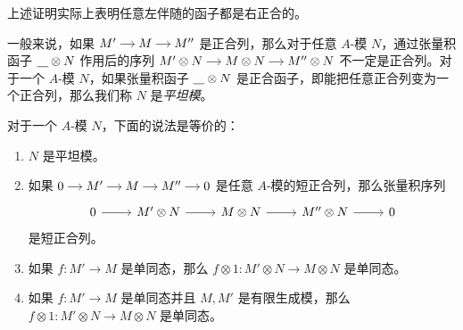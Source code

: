 上述证明实际上表明任意左伴随的函子都是右正合的。

一般来说，如果 
$
  \begin{tikzcd}[cramped,column sep=small]
    M'\arrow[r] & M\arrow[r] & M''
  \end{tikzcd}
$
是正合列，那么对于任意 $A$-模 $N$，通过张量积函子 $\uline\otimes N$ 作用后的序列
$
  \begin{tikzcd}[cramped,column sep=small]
    M'\otimes N\arrow[r] & M\otimes N\arrow[r] & M''\otimes N
  \end{tikzcd}
$
不一定是正合列。对于一个 $A$-模 $N$，如果张量积函子 $\uline\otimes N$ 
是正合函子，即能把任意正合列变为一个正合列，那么我们称 $N$ 是\emph{平坦模}。

\begin{proposition}
  对于一个 $A$-模 $N$，下面的说法是等价的：
  \begin{enumerate}
    \item $N$ 是平坦模。
    \item 如果 
    $
      \begin{tikzcd}[cramped,column sep=small]
        0\arrow[r] & M'\arrow[r] & M\arrow[r] & M''\arrow[r] & 0
      \end{tikzcd}
    $
    是任意 $A$-模的短正合列，那么张量积序列
    \[
      \begin{tikzcd}
        0\arrow[r] & M'\otimes N\arrow[r] & M\otimes N\arrow[r] & M''\otimes N\arrow[r] & 0
      \end{tikzcd}
    \]
    是短正合列。
    \item 如果 $f:M'\to M$ 是单同态，那么 $f\otimes 1:M'\otimes N\to M\otimes N$
    是单同态。
    \item 如果 $f:M'\to M$ 是单同态并且 $M,M'$ 是有限生成模，那么
    $f\otimes 1:M'\otimes N\to M\otimes N$ 是单同态。
  \end{enumerate}
\end{proposition}
